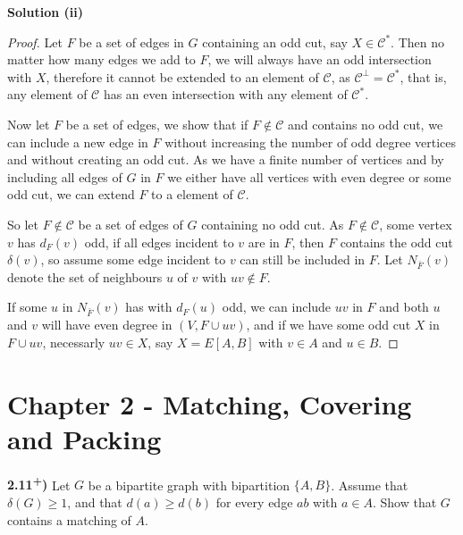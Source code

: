 \documentclass[11pt]{article}
\theoremstyle{plain}
\begin{document}
\noindent \textbf{Solution (ii)}

\begin{proof}
Let $F$ be a set of edges in $G$ containing an odd cut, say $X \in \mathcal{C}^*$. Then no matter how many edges we add to $F$, we will always have an odd intersection with $X$, therefore it cannot be extended to an element of $\mathcal{C}$, as $\mathcal{C}^\perp = \mathcal{C}^*$, that is, any element of $\mathcal{C}$ has an even intersection with any element of $\mathcal{C}^*$.

Now let $F$ be a set of edges, we show that if $F \not \in \mathcal{C}$ and contains no odd cut, we can include a new edge in $F$ without increasing the number of odd degree vertices and without creating an odd cut. As we have a finite number of vertices and by including all edges of $G$ in $F$ we either have all vertices with even degree or some odd cut, we can extend $F$ to a element of $\mathcal{C}$.

So let $F \not \in \mathcal{C}$ be a set of edges of $G$ containing no odd cut. As $F \not \in \mathcal{C}$, some vertex $v$ has $d_F(v)$ odd, if all edges incident to $v$ are in $F$, then $F$ contains the odd cut $\delta(v)$, so assume some edge incident to $v$ can still be included in $F$. Let $N_{\bar{F}}(v)$ denote the set of neighbours $u$ of $v$ with $uv \not \in F$.

If some $u$ in $N_{\bar{F}}(v)$ has with $d_F(u)$ odd, we can include $uv$ in $F$ and both $u$ and $v$ will have even degree in $(V,F \cup uv)$, and if we have some odd cut $X$ in $F \cup uv$, necessarly $uv \in X$, say $X = E[A,B]$ with $v \in A$ and $u \in B$.
\end{proof}

\newpage
\section*{Chapter 2 - Matching, Covering and Packing}

\textbf{2.11\textsuperscript{+})} Let $G$ be a bipartite graph with bipartition $\{A,B\}$. Assume that $\delta(G) \geq 1$, and that $d(a) \geq d(b)$ for every edge $ab$ with $a \in A$. Show that $G$ contains a matching of $A$.
\end{document}
